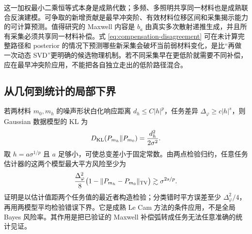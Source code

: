 这一加权最小二乘恒等式本身是成熟代数；多频、多照明共享同一材料也是成熟联合反演建模。可争取的新增贡献是最早冲突阶、有效材料位移区间和采集揭示能力的可计算预测。值得研究的 Maxwell 内容是 $b_a$ 由真实多次散射递推生成，并且所有采集必须共享同一材料补偿。式 \eqref{eq:compensation-disagreement} 可在未计算完整路径和 posterior 的情况下预测哪些新采集会破坏当前弱材料变化，是比“再做一次动态 SVD”更明确的候选物理机制。若不同采集早在更低阶就需要不同补偿，应在最早冲突阶应用，不能把各自独立走出的低阶路径混合。

\subsection{从几何到统计的局部下界}
若两材料 $m_0,m_h$ 的噪声形状白化响应距离 $d_h\le C|h|^p$，任务差异 $\Delta_\varphi\ge c|h|^s$，则 Gaussian 数据模型的 KL 为
\[
D_{\rm KL}(P_{m_h}\|P_{m_0})=\frac{d_h^2}{2\sigma^2}.
\]
取 $h=a\sigma^{1/p}$ 且 $a$ 足够小，可使总变差小于固定常数。由两点检验归约，任意任务估计器的这两个模型最大平方风险至少为
\[
\frac{\Delta_\varphi^2}{8}
\bigl(1-\|P_{m_h}-P_{m_0}\|_{\rm TV}\bigr)
\gtrsim \sigma^{2s/p}.
\]
证明是以估计值距两个任务值的最近者构造检验；分类错时平方误差至少 $\Delta_\varphi^2/4$，再用两模型平均检验错误下界。它是成熟 Le Cam 方法的条件应用，不是全局 Bayes 风险率。其作用是把已验证的 Maxwell 补偿弧转成任务无法任意准确的统计见证。

